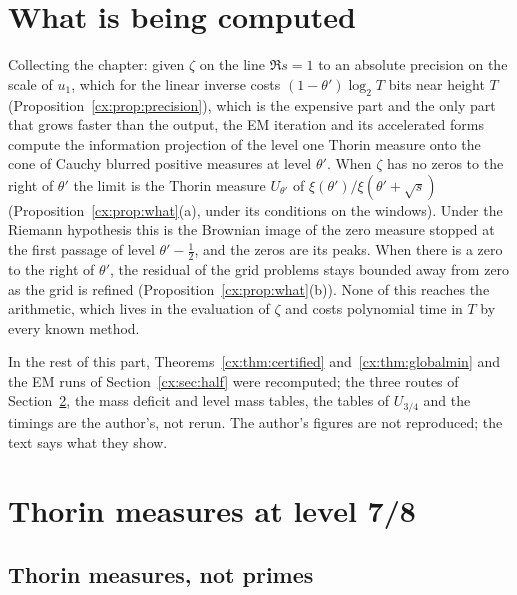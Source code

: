 \section{What is being computed}\label{cx:sec:computed}

Collecting the chapter: given $\zeta$ on the line $\Re s=1$ to an absolute precision on the scale of $u_1$, which for the linear inverse costs $(1-\theta')\log_2T$ bits near height $T$ (Proposition~\ref{cx:prop:precision}), which is the expensive part and the only part that grows faster than the output, the EM iteration and its accelerated forms compute the information projection of the level one Thorin measure onto the cone of Cauchy blurred positive measures at level $\theta'$. When $\zeta$ has no zeros to the right of $\theta'$ the limit is the Thorin measure $U_{\theta'}$ of $\xi(\theta')/\xi(\theta'+\sqrt s)$ (Proposition~\ref{cx:prop:what}(a), under its conditions on the windows). Under the Riemann hypothesis this is the Brownian image of the zero measure stopped at the first passage of level $\theta'-\tfrac12$, and the zeros are its peaks. When there is a zero to the right of $\theta'$, the residual of the grid problems stays bounded away from zero as the grid is refined (Proposition~\ref{cx:prop:what}(b)). None of this reaches the arithmetic, which lives in the evaluation of $\zeta$ and costs polynomial time in $T$ by every known method.

In the rest of this part, Theorems~\ref{cx:thm:certified} and~\ref{cx:thm:globalmin} and the EM runs of Section~\ref{cx:sec:half} were recomputed; the three routes of Section~\ref{cx:sec:level78}, the mass deficit and level mass tables, the tables of $U_{3/4}$ and the timings are the author's, not rerun. The author's figures are not reproduced; the text says what they show.

\section{Thorin measures at level 7/8}\label{cx:sec:level78}

\subsection{Thorin measures, not primes}

